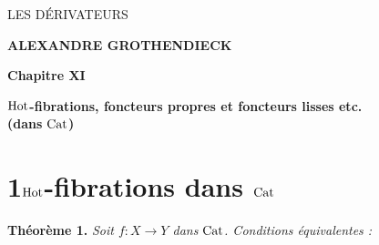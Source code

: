 \dgrchunkbegin

\printedpage{--}

\begin{center}
\vspace*{5cm}
{\LARGE\textsf{LES DÉRIVATEURS}}

\vspace{1.5em}
{\large\textbf{ALEXANDRE GROTHENDIECK}}

\vspace{3em}
{\large\textbf{Chapitre XI}}

\vspace{0.5em}
{\large $\mathrm{Hot}$\textbf{-fibrations, foncteurs propres et foncteurs lisses etc.}\\
\textbf{(dans} $\mathrm{Cat}$\textbf{)}}
\end{center}

\clearpage

\printedpage{--}


\clearpage


\noindent


\section*{1\quad $\mathrm{Hot}$-fibrations dans $\mathrm{Cat}$}

\noindent\textbf{Théorème 1.} \textit{Soit $f : X \longrightarrow Y$ dans} $\mathrm{Cat}$\textit{. Conditions équivalentes :}

